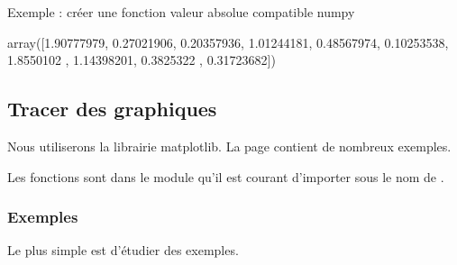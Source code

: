 \documentclass[letterpaper,10pt,english]{sphinxhowto}
\begin{document}
\sphinxAtStartPar
Exemple : créer une fonction valeur absolue compatible numpy

\begin{sphinxVerbatim}[commandchars=\\\{\}]
 
      
    \PYG{p}{[}\PYG{p}{]}  
     

    
\end{sphinxVerbatim}

\begin{sphinxVerbatim}[commandchars=\\\{\}]
array([1.90777979, 0.27021906, 0.20357936, 1.01244181, 0.48567974,
       0.10253538, 1.8550102 , 1.14398201, 0.3825322 , 0.31723682])
\end{sphinxVerbatim}


\subsection{Tracer des graphiques}
\label{\detokenize{cours7_graphiques_cours:tracer-des-graphiques}}\label{\detokenize{cours7_graphiques_cours::doc}}
\sphinxAtStartPar
Nous utiliserons la librairie matplotlib. La page  contient de nombreux exemples.

\sphinxAtStartPar
Les fonctions sont dans le module  qu’il est courant d’importer sous le nom de .


\subsubsection{Exemples}
\label{\detokenize{cours7_graphiques_cours:exemples}}
\sphinxAtStartPar
Le plus simple est d’étudier des exemples.
\end{document}
